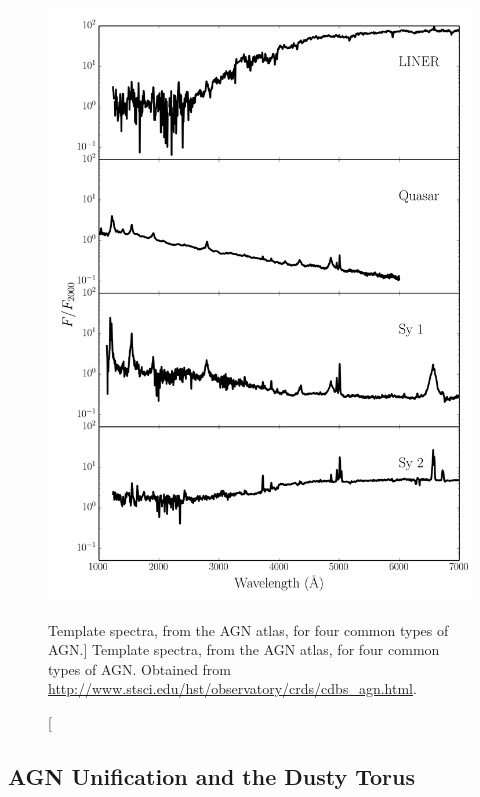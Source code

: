 \begin{figure}
\centering
\includegraphics[width=1.0\textwidth]{figures/01-intro/agn_templates.png}
\caption
[Template spectra, from the AGN atlas, for four common types of AGN.]
{
Template spectra, from the AGN atlas, for four common types of AGN.
Obtained from \url{http://www.stsci.edu/hst/observatory/crds/cdbs_agn.html}.
} 
\label{fig:agn_templates}
\end{figure} 


\subsection{AGN Unification and the Dusty Torus}
\label{agn_unification}

